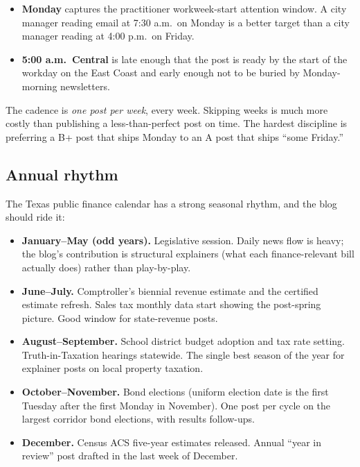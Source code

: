 \documentclass[11pt]{article}
\begin{document}
\begin{itemize}
\item \textbf{Monday} captures the practitioner workweek-start
attention window. A city manager reading email at 7:30 a.m.\ on
Monday is a better target than a city manager reading at 4:00 p.m.\
on Friday.
\item \textbf{5:00 a.m.\ Central} is late enough that the post is
ready by the start of the workday on the East Coast and early
enough not to be buried by Monday-morning newsletters.
\end{itemize}

The cadence is \emph{one post per week}, every week. Skipping weeks
is much more costly than publishing a less-than-perfect post on
time. The hardest discipline is preferring a B+ post that ships
Monday to an A post that ships ``some Friday.''

\subsection{Annual rhythm}

The Texas public finance calendar has a strong seasonal rhythm,
and the blog should ride it:

\begin{itemize}
\item \textbf{January--May (odd years).} Legislative session. Daily
news flow is heavy; the blog's contribution is structural
explainers (what each finance-relevant bill actually does) rather
than play-by-play.

\item \textbf{June--July.} Comptroller's biennial revenue estimate
and the certified estimate refresh. Sales tax monthly data start
showing the post-spring picture. Good window for state-revenue
posts.

\item \textbf{August--September.} School district budget adoption
and tax rate setting. Truth-in-Taxation hearings statewide. The
single best season of the year for explainer posts on local property
taxation.

\item \textbf{October--November.} Bond elections (uniform election
date is the first Tuesday after the first Monday in November). One
post per cycle on the largest corridor bond elections, with results
follow-ups.

\item \textbf{December.} Census ACS five-year estimates released.
Annual ``year in review'' post drafted in the last week of December.
\end{itemize}
\end{document}
